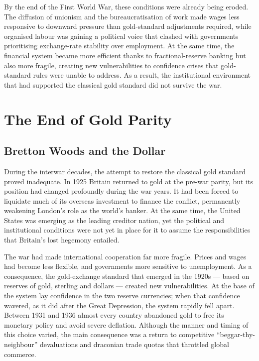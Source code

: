 By the end of the First World War, these conditions were already being eroded. The diffusion of unionism and the bureaucratisation of work made wages less responsive to downward pressure than gold-standard adjustments required, while organised labour was gaining a political voice that clashed with governments prioritising exchange-rate stability over employment. At the same time, the financial system became more efficient thanks to fractional-reserve banking but also more fragile, creating new vulnerabilities to confidence crises that gold-standard rules were unable to address. As a result, the institutional environment that had supported the classical gold standard did not survive the war.
\section{The End of Gold Parity}
\subsection{Bretton Woods and the Dollar}
During the interwar decades, the attempt to restore the classical gold standard proved inadequate. In 1925 Britain returned to gold at the pre-war parity, but its position had changed profoundly during the war years. It had been forced to liquidate much of its overseas investment to finance the conflict, permanently weakening London's role as the world's banker. At the same time, the United States was emerging as the leading creditor nation, yet the political and institutional conditions were not yet in place for it to assume the responsibilities that Britain's lost hegemony entailed.

The war had made international cooperation far more fragile. Prices and wages had become less flexible, and governments more sensitive to unemployment. As a consequence, the gold-exchange standard that emerged in the 1920s --- based on reserves of gold, sterling and dollars --- created new vulnerabilities. At the base of the system lay confidence in the two reserve currencies; when that confidence wavered, as it did after the Great Depression, the system rapidly fell apart. Between 1931 and 1936 almost every country abandoned gold to free its monetary policy and avoid severe deflation. Although the manner and timing of this choice varied, the main consequence was a return to competitive ``beggar-thy-neighbour'' devaluations and draconian trade quotas that throttled global commerce.

